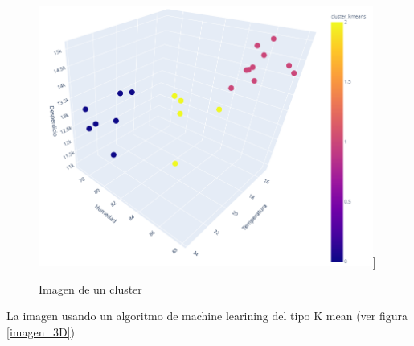 \begin{figure}[h!]
    \centering
    \includegraphics[width = 11cm]{figuras/cluster_3D.PNG}]
    \caption{Imagen de un cluster}
\end{figure}

\newpage
La imagen usando un algoritmo de machine learining del tipo K mean (ver figura \ref{imagen_3D})
